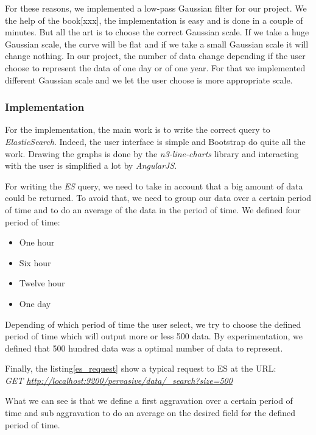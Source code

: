 \documentclass{acm_proc_article-sp}
\begin{document}
For these reasons, we implemented a low-pass Gaussian filter for our project. We the help of the book[xxx], the implementation is easy and is done in a couple of minutes. But all the art is to choose the correct Gaussian scale. If we take a huge Gaussian scale, the curve will be flat and if we take a small Gaussian scale it will change nothing. In our project, the number of data change depending if the user choose to represent the data of one day or of one year. For that we implemented different Gaussian scale and we let the user choose is more appropriate scale. 

\subsubsection{Implementation}
For the implementation, the main work is to write the correct query to \emph{ElasticSearch}. Indeed, the user interface is simple and Bootstrap do quite all the work. Drawing the graphs is done by the \emph{n3-line-charts} library and interacting with the user is simplified a lot by \emph{AngularJS}.

For writing the \emph{ES} query, we need to take in account that a big amount of data could be returned. To avoid that, we need to group our data over a certain period of time and to do an average of the data in the period of time. We defined four period of time:
\begin{itemize}
\item One hour
\item Six hour
\item Twelve hour
\item One day
\end{itemize}

Depending of which period of time the user select, we try to choose the defined period of time which will output more or less 500 data. By experimentation, we defined that 500 hundred data was a optimal number of data to represent.

Finally, the listing\ref{es_request} show a typical request to ES at the URL:\\
\emph{GET \url{http://localhost:9200/pervasive/data/_search?size=500}}



What we can see is that we define a first aggravation over a certain period of time and sub aggravation to do an average on the desired field for the defined period of time.
\end{document}
